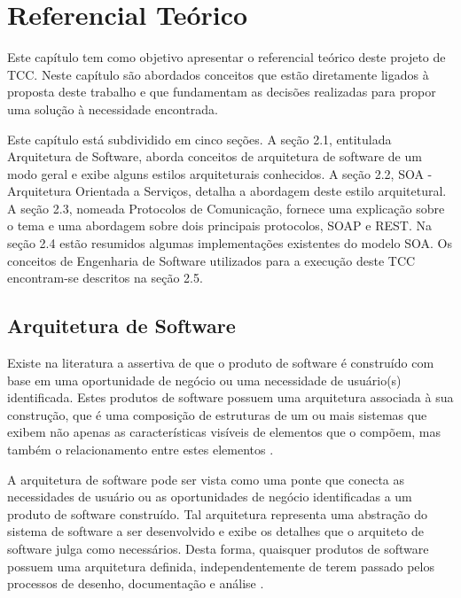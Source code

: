 \chapter[Referencial Teórico]{Referencial Teórico}

Este capítulo tem como objetivo apresentar o referencial teórico deste projeto de TCC. Neste capítulo são abordados conceitos que estão diretamente ligados à proposta deste trabalho e que fundamentam as decisões realizadas para propor uma solução à necessidade encontrada.

Este capítulo está subdividido em cinco seções. A seção 2.1, entitulada Arquitetura de Software, aborda conceitos de arquitetura de software de um modo geral e exibe alguns estilos arquiteturais conhecidos. A seção 2.2, SOA - Arquitetura Orientada a Serviços, detalha a abordagem deste estilo arquitetural. A seção 2.3, nomeada Protocolos de Comunicação, fornece uma explicação sobre o tema e uma abordagem sobre dois principais protocolos, SOAP e REST. Na seção 2.4 estão resumidos algumas implementações existentes do modelo SOA. Os conceitos de Engenharia de Software utilizados para a execução deste TCC encontram-se descritos na seção 2.5.

\section{Arquitetura de Software}
Existe na literatura a assertiva de que o produto de software é construído com base em uma oportunidade de negócio ou uma necessidade de usuário(s) identificada. Estes produtos de software possuem uma arquitetura associada à sua construção, que é uma composição de estruturas de um ou mais sistemas que exibem não apenas as características visíveis de elementos que o compõem, mas também o relacionamento entre estes elementos \cite{bass_software_archi_practice_2003}.

A arquitetura de software pode ser vista como uma ponte que conecta as necessidades de usuário ou as oportunidades de negócio identificadas a um produto de software construído. Tal arquitetura representa uma abstração do sistema de software a ser desenvolvido e exibe os detalhes que o arquiteto de software julga como necessários. Desta forma, quaisquer produtos de software possuem uma arquitetura definida, independentemente de terem passado pelos processos de desenho, documentação e análise \cite{bass_software_archi_practice_2003}.


